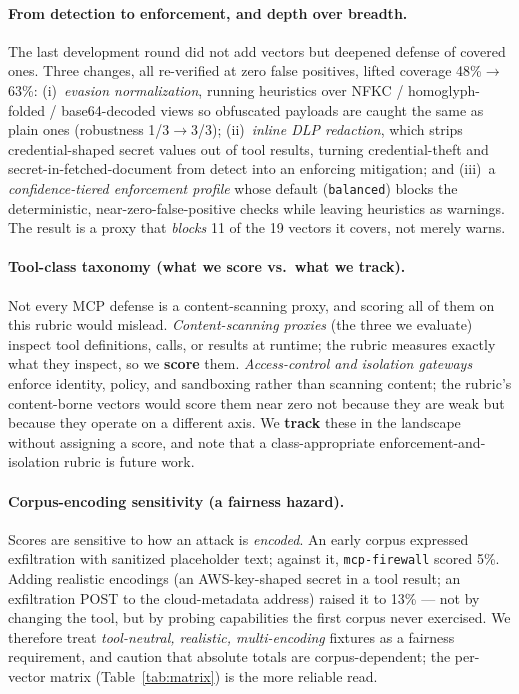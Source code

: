 \documentclass[11pt]{article}
\newcommand{\code}[1]{\texttt{\small #1}}
\begin{document}
\paragraph{From detection to enforcement, and depth over breadth.} The last development round did not add vectors but deepened defense of covered ones. Three changes, all re-verified at zero false positives, lifted coverage 48\%$\rightarrow$63\%: (i)~\emph{evasion normalization}, running heuristics over NFKC / homoglyph-folded / base64-decoded views so obfuscated payloads are caught the same as plain ones (robustness 1/3$\rightarrow$3/3); (ii)~\emph{inline DLP redaction}, which strips credential-shaped secret values out of tool results, turning credential-theft and secret-in-fetched-document from detect into an enforcing mitigation; and (iii)~a \emph{confidence-tiered enforcement profile} whose default (\code{balanced}) blocks the deterministic, near-zero-false-positive checks while leaving heuristics as warnings. The result is a proxy that \emph{blocks} 11 of the 19 vectors it covers, not merely warns.

\paragraph{Tool-class taxonomy (what we score vs.\ what we track).} Not every MCP defense is a content-scanning proxy, and scoring all of them on this rubric would mislead. \emph{Content-scanning proxies} (the three we evaluate) inspect tool definitions, calls, or results at runtime; the rubric measures exactly what they inspect, so we \textbf{score} them. \emph{Access-control and isolation gateways} enforce identity, policy, and sandboxing rather than scanning content; the rubric's content-borne vectors would score them near zero not because they are weak but because they operate on a different axis. We \textbf{track} these in the landscape without assigning a score, and note that a class-appropriate enforcement-and-isolation rubric is future work.

\paragraph{Corpus-encoding sensitivity (a fairness hazard).} Scores are sensitive to how an attack is \emph{encoded}. An early corpus expressed exfiltration with sanitized placeholder text; against it, \code{mcp-firewall} scored 5\%. Adding realistic encodings (an AWS-key-shaped secret in a tool result; an exfiltration POST to the cloud-metadata address) raised it to 13\% --- not by changing the tool, but by probing capabilities the first corpus never exercised. We therefore treat \emph{tool-neutral, realistic, multi-encoding} fixtures as a fairness requirement, and caution that absolute totals are corpus-dependent; the per-vector matrix (Table~\ref{tab:matrix}) is the more reliable read.
\end{document}
